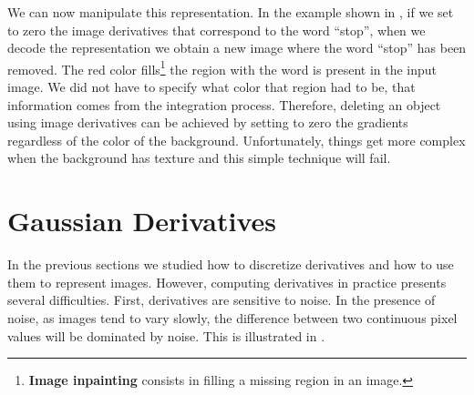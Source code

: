 We can now manipulate this representation. In the example shown in \fig{\ref{fig:edit_with_derivatives}}, if we set to zero the image derivatives that correspond to the word ``stop'', when we decode the representation we obtain a new image where the word ``stop'' has been removed. The red color fills\footnote{{\bf Image inpainting} consists in filling a missing region in an image.}  the region with the word is present in the input image.
We did not have to specify what color that region had to be, that information comes from the integration process. Therefore, deleting an object using image derivatives can be achieved by setting to zero the gradients regardless of the color of the background. Unfortunately, things get more complex when the background has texture and this simple technique will fail. 




\section{Gaussian Derivatives}

In the previous sections we studied how to discretize derivatives and how to use them to represent images. However, computing derivatives in practice presents several difficulties. First, derivatives are sensitive to noise. In the presence of noise, as images tend to vary slowly, the difference between two continuous pixel values will be dominated by noise. This is illustrated in \fig{\ref{fig:derivativesnoisystop}}.


